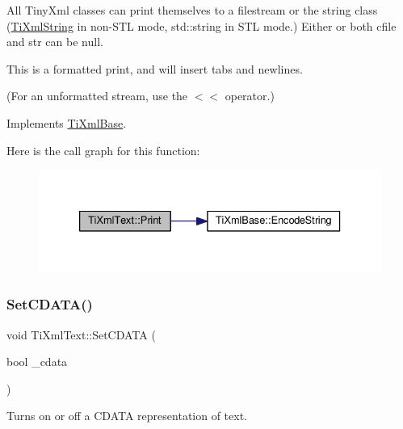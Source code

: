 All Tiny\+Xml classes can print themselves to a filestream or the string class (\hyperlink{class_ti_xml_string}{Ti\+Xml\+String} in non-\/\+S\+TL mode, std\+::string in S\+TL mode.) Either or both cfile and str can be null.

This is a formatted print, and will insert tabs and newlines.

(For an unformatted stream, use the $<$$<$ operator.) 

Implements \hyperlink{class_ti_xml_base_a0de56b3f2ef14c65091a3b916437b512}{Ti\+Xml\+Base}.

Here is the call graph for this function\+:
\nopagebreak
\begin{figure}[H]
\begin{center}
\leavevmode
\includegraphics[width=333pt]{class_ti_xml_text_a75f6895906333894e2574cc8cf77ea79_cgraph}
\end{center}
\end{figure}
\mbox{\label{class_ti_xml_text_acb17ff7c5d09b2c839393445a3de5ea9}} 
\subsubsection{\texorpdfstring{Set\+C\+D\+A\+T\+A()}{SetCDATA()}}
{\footnotesize\ttfamily void Ti\+Xml\+Text\+::\+Set\+C\+D\+A\+TA (\begin{DoxyParamCaption}\item[{bool}]{\+\_\+cdata }\end{DoxyParamCaption})\hspace{0.3cm}{\ttfamily [inline]}}



Turns on or off a C\+D\+A\+TA representation of text. 

